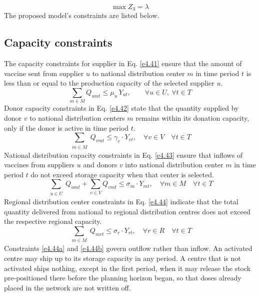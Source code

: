 \documentclass[a4paper]{elsarticle}
\begin{document}
{\begin{equation}
\max Z_3 = \lambda
\label{e4.4}
\end{equation}
The proposed model's constraints are listed below.
\subsection{Capacity constraints}
\noindent The capacity constraints for supplier in Eq. \ref{e4.41} ensure that the amount of vaccine sent from supplier $u$ to national distribution center $m$ in time period $t$ is less than or equal to the production capacity of the selected supplier $u$.
\begin{equation}
\sum_{m \in M} Q_{umt} \leq \mu_u\, Y_{ut}, \qquad \forall u \in U,\ \forall t \in T
\label{e4.41}
\end{equation}
Donor capacity constraints in Eq. \ref{e4.42} state that the quantity supplied by donor $v$ to national distribution centers $m$ remains within its donation capacity, only if the donor is active in time period $t$.
\begin{equation}
\label{e4.42}
\sum_{\substack{m \in M}} Q_{vmt} \leq \gamma_v \cdot Y_{vt},
\quad \forall v \in V \quad \forall t \in T
\end{equation}
National distribution capacity constraints in Eq. \ref{e4.43} ensure that inflows of vaccines from suppliers $u$ and donors $v$ into national distribution center $m$ in time period $t$ do not exceed storage capacity when that center is selected.
\begin{equation}
\label{e4.43}
\sum_{\substack{u \in U}} Q_{umt} + \sum_{v \in V} Q_{vmt} \leq \sigma_m \cdot Y_{mt},
\quad \forall m \in M \quad \forall t \in T
\end{equation}
Regional distribution center constraints in Eq. \ref{e4.44} indicate that the total quantity delivered from national to regional distribution centres does not exceed the respective regional capacity.
\begin{equation}
\label{e4.44}
\sum_{\substack{m \in M }} Q_{mrt} \leq \sigma_r \cdot Y_{rt},
\quad \forall r \in R \quad \forall t \in T
\end{equation}
Constraints \ref{e4.44a} and \ref{e4.44b} govern outflow rather than inflow. An activated centre may ship up to its storage capacity in any period. A centre that is not activated ships nothing, except in the first period, when it may release the stock pre-positioned there before the planning horizon began, so that doses already placed in the network are not written off.
}
\end{document}
